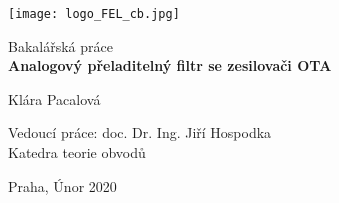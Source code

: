 \begin{titlepage}
    \begin{center}
    
        \texttt{[image: logo\_FEL\_cb.jpg]}
            
        \vspace*{3cm}
 	
        \Large Bakalářská práce \\
        \vspace*{1.5cm}
        \Huge
        \textbf{Analogový přeladitelný filtr se zesilovači OTA}
 
        \vspace{1cm}

        \Large{Klára Pacalová}
 
        \vfill
 
        \vspace{0.8cm}
 		
        \Large
 		Vedoucí práce: doc. Dr. Ing. Jiří Hospodka\\
    		\large Katedra teorie obvodů\\
		
		\vspace{1.5cm}
		        
		\large Praha, Únor 2020
 
    \end{center}
\end{titlepage}
